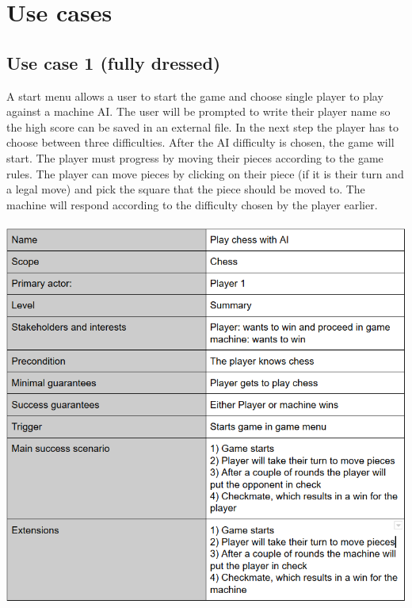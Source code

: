 \documentclass{article}
\begin{document}
    \vspace{100mm}
    \section{Use cases}
        \subsection{Use case 1 (fully dressed)}
        A start menu allows a user to start the game and choose single player to
        play against a machine AI. The user will be prompted to write their player
        name so the high score can be saved in an external file. In the next step
        the player has to choose between three difficulties. After the AI difficulty
        is chosen, the game will start. The player must progress by moving their
        pieces according to the game rules. The player can move pieces by clicking
        on their piece (if it is their turn and a legal move) and pick the square that
        the piece should be moved to. The machine will respond according to the 
        difficulty chosen by the player earlier. \\ \\
        \includegraphics[width=\linewidth]{play-ai.png}
        
        \vspace{30mm}
\end{document}
